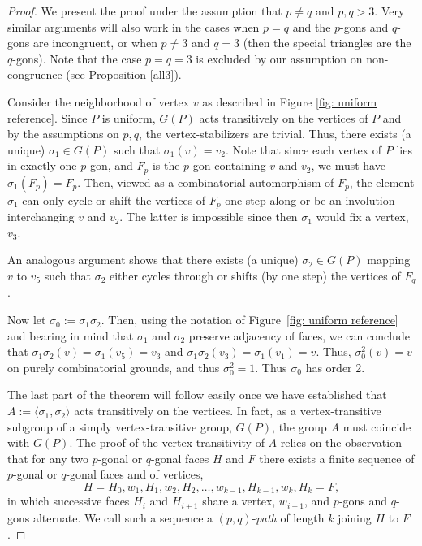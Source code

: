 \documentclass[12pt]{article}
\theoremstyle{definition}\newtheorem{definition}{Definition}[section]
\begin{document}
\begin{proof} 
We present the proof under the assumption that $p\neq q$ and $p,q>3$. Very similar arguments will also work in the cases when $p=q$ and the $p$-gons and $q$-gons are incongruent, or when $p\neq 3$ and $q=3$ (then the special triangles are the $q$-gons). Note that the case $p=q=3$ is excluded by our assumption on non-congruence (see Proposition \ref{all3}). \smallskip

Consider the neighborhood of vertex $v$ as described in Figure \ref{fig: uniform reference}. Since $P$ is uniform, $G(P)$ acts transitively on the vertices of $P$ and by the assumptions on $p,q$, the vertex-stabilizers are trivial. Thus, there exists (a unique) $\sigma_1 \in G(P)$ such that $\sigma_1(v) = v_2$. Note that since each vertex of $P$ lies in exactly one $p$-gon, and $F_p$ is the $p$-gon containing $v$ and $v_2$, we must have $\sigma_1(F_p)=F_p$. Then, viewed as a combinatorial automorphism of $F_p$, the element $\sigma_1$ can only cycle or shift the vertices of $F_p$ one step along or be an involution interchanging $v$ and $v_2$. The latter is impossible since then $\sigma_1$ would fix a vertex, $v_3$.\smallskip

An analogous argument shows that there exists (a unique) $\sigma_2 \in G(P)$ mapping $v$ to $v_5$ such that $\sigma_2$ either cycles through or shifts (by one step) the vertices of $F_q$. \smallskip

Now let $\sigma_0 := \sigma_1 \sigma_2$. Then, using the notation of Figure~\ref{fig: uniform reference} and bearing in mind that $\sigma_1$ and $\sigma_2$ preserve adjacency of faces, we can conclude that  $\sigma_1\sigma_2(v) = \sigma_1(v_5) = v_3$ and $\sigma_1\sigma_2(v_3) = \sigma_1(v_1) = v$. Thus, $\sigma_0^2(v) = v$ on purely combinatorial grounds, and thus $\sigma_0^2 = 1$. Thus $\sigma_0$ has order 2.  \smallskip

The last part of the theorem will follow easily once we have established  that $A:=\langle\sigma_1,\sigma_2\rangle$ acts transitively on the  vertices. In fact, as a vertex-transitive subgroup of a simply vertex-transitive group, $G(P)$, the group $A$ must coincide with $G(P)$. The proof of the vertex-transitivity of $A$ relies on the observation  that for any two $p$-gonal or $q$-gonal faces $H$ and $F$ there exists a finite sequence of $p$-gonal or $q$-gonal faces and of vertices, 
$$H=H_0,w_1,H_1,w_2,H_2,\ldots,w_{k-1},H_{k-1},w_k,H_k = F,$$
in which successive faces $H_{i}$ and $H_{i+1}$ share a vertex, $w_{i+1}$, and $p$-gons and $q$-gons alternate. We call such a sequence a $(p,q)$-{\it path\/} of length $k$ joining $H$ to $F$.
\smallskip


\end{proof}
\end{document}
